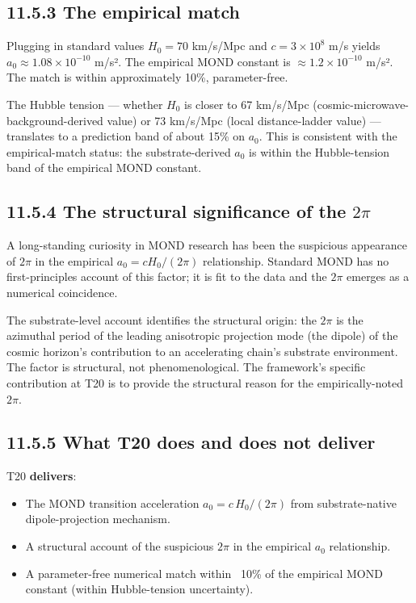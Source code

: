 \documentclass[11pt]{book}
\begin{document}
\subsection{11.5.3 The empirical match}

Plugging in standard values $H_0 = 70$ km/s/Mpc and $c = 3 \times 10^8$ m/s yields $a_0 \approx 1.08 \times 10^{-10}$ m/s². The empirical MOND constant is $\approx 1.2 \times 10^{-10}$ m/s². The match is within approximately 10\%, parameter-free.

The Hubble tension — whether $H_0$ is closer to 67 km/s/Mpc (cosmic-microwave-background-derived value) or 73 km/s/Mpc (local distance-ladder value) — translates to a prediction band of about 15\% on $a_0$. This is consistent with the empirical-match status: the substrate-derived $a_0$ is within the Hubble-tension band of the empirical MOND constant.

\subsection{11.5.4 The structural significance of the $2\pi$}

A long-standing curiosity in MOND research has been the suspicious appearance of $2\pi$ in the empirical $a_0 = cH_0/(2\pi)$ relationship. Standard MOND has no first-principles account of this factor; it is fit to the data and the $2\pi$ emerges as a numerical coincidence.

The substrate-level account identifies the structural origin: the $2\pi$ is the azimuthal period of the leading anisotropic projection mode (the dipole) of the cosmic horizon's contribution to an accelerating chain's substrate environment. The factor is structural, not phenomenological. The framework's specific contribution at T20 is to provide the structural reason for the empirically-noted $2\pi$.

\subsection{11.5.5 What T20 does and does not deliver}

T20 \textbf{delivers}:
\begin{itemize}
\item The MOND transition acceleration $a_0 = c\,H_0/(2\pi)$ from substrate-native dipole-projection mechanism.
\item A structural account of the suspicious $2\pi$ in the empirical $a_0$ relationship.
\item A parameter-free numerical match within ~10\% of the empirical MOND constant (within Hubble-tension uncertainty).
\end{itemize}
\end{document}
